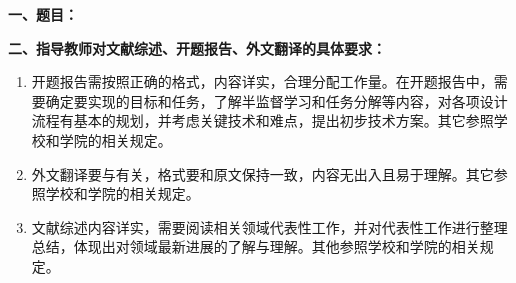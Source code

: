{
\setlength{\parindent}{0em}
\par {\bfseries 一、题目：\Title}
\\
\par {\bfseries 二、指导教师对文献综述、开题报告、外文翻译的具体要求：}
}

\begin{enumerate}
    \item 开题报告需按照正确的格式，内容详实，合理分配工作量。在开题报告中，需要确定{\Title}要实现的目标和任务，了解半监督学习和任务分解等内容，对各项设计流程有基本的规划，并考虑关键技术和难点，提出初步技术方案。其它参照学校和学院的相关规定。
    \item 外文翻译要与{\Title}有关，格式要和原文保持一致，内容无出入且易于理解。其它参照学校和学院的相关规定。
    \item 文献综述内容详实，需要阅读相关领域代表性工作，并对代表性工作进行整理总结，体现出对{\Title}领域最新进展的了解与理解。其他参照学校和学院的相关规定。
\end{enumerate}

\vfill


\signature{指导教师（签名）}
